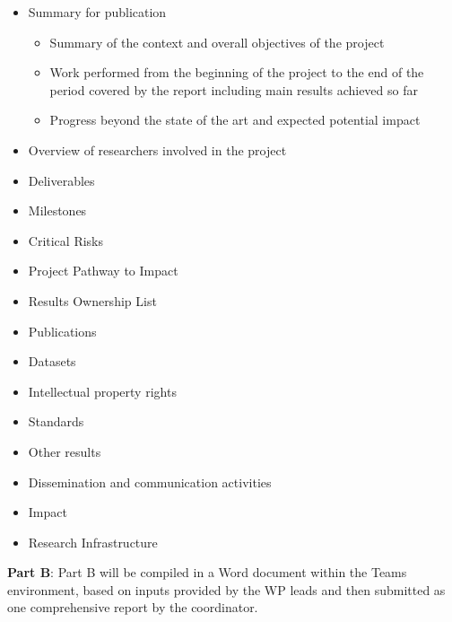 \documentclass[
]{article}
\providecommand{\tightlist}{%
  \setlength{\itemsep}{0pt}\setlength{\parskip}{0pt}}
\begin{document}
\begin{itemize}
\item
  Summary for publication

  \begin{itemize}
  \tightlist
  \item
    Summary of the context and overall objectives of the project\\
  \item
    Work performed from the beginning of the project to the end of the period covered by the report including main results achieved so far\\
  \item
    Progress beyond the state of the art and expected potential impact
  \end{itemize}
\item
  Overview of researchers involved in the project\\
\item
  Deliverables\\
\item
  Milestones\\
\item
  Critical Risks\\
\item
  Project Pathway to Impact\\
\item
  Results Ownership List\\
\item
  Publications\\
\item
  Datasets\\
\item
  Intellectual property rights\\
\item
  Standards\\
\item
  Other results\\
\item
  Dissemination and communication activities\\
\item
  Impact\\
\item
  Research Infrastructure
\end{itemize}

\textbf{Part B}: Part B will be compiled in a Word document within the Teams environment, based on inputs provided by the WP leads and then submitted as one comprehensive report by the coordinator.
\end{document}
